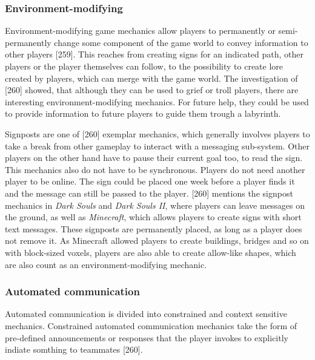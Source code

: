 \subsubsection{Environment-modifying}
\label{section:Environment-modifying}

Environment-modifying game mechanics allow players to permanently or semi-permanently change some component of the game world to convey information to other players \autocite{Toups2014ATheory}[259].
This reaches from creating signs for an indicated path, other players or the player themselves can follow, to the possibility to create lore created by players, which can merge with the game world. The investigation of \textcite{Toups2014ATheory}[260] showed, that although they can be used to grief or troll players, there are interesting environment-modifying mechanics.
For future help, they could be used to provide information to future players to guide them trough a labyrinth.

Signposts are one of \textcite{Toups2014ATheory}[260] exemplar mechanics, which generally involves players to take a break from other gameplay to interact with a messaging sub-system. Other players on the other hand have to pause their current goal too, to read the sign. This mechanics also do not have to be synchronous.
Players do not need another player to be online. The sign could be placed one week before a player finds it and the message can still be passed to the player. \textcite{Cheung2012CommunicationGaming}[260] mentions the signpost mechanics in \textit{Dark Souls} and \textit{Dark Souls II}, where players can leave messages on the ground, as well as \textit{Minecraft}, which allows players to create signs with short text messages. These signposts are permanently placed, as long as a player does not remove it. As Minecraft allowed players to create buildings, bridges and so on with block-sized voxels, players are also able to create allow-like shapes, which are also count as an environment-modifying mechanic.


\subsubsection{Automated communication}
\label{section:Automated communication}

Automated communication is divided into constrained and context sensitive mechanics.
Constrained automated communication mechanics take the form of pre-defined announcements or responses that the player invokes to explicitly indiate somthing to teammates \autocite{Toups2014ATheory}[260].

